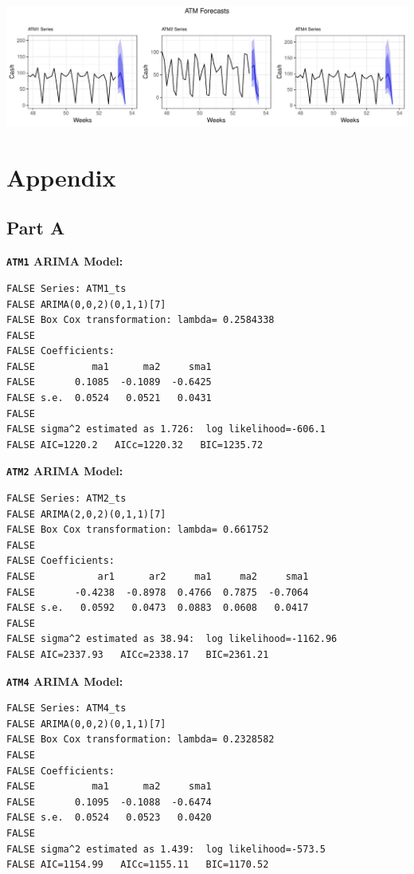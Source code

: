 \documentclass[openany]{book}
\begin{document}
\includegraphics{Part-A-JM_files/figure-latex/unnamed-chunk-7-1.pdf}

\hypertarget{Appendix}{%
\chapter*{Appendix}\label{Appendix}}

\hypertarget{Part-A}{%
\section*{Part A}\label{Part-A}}

\textbf{\texttt{ATM1} ARIMA Model:}

\begin{verbatim}
FALSE Series: ATM1_ts 
FALSE ARIMA(0,0,2)(0,1,1)[7] 
FALSE Box Cox transformation: lambda= 0.2584338 
FALSE 
FALSE Coefficients:
FALSE          ma1      ma2     sma1
FALSE       0.1085  -0.1089  -0.6425
FALSE s.e.  0.0524   0.0521   0.0431
FALSE 
FALSE sigma^2 estimated as 1.726:  log likelihood=-606.1
FALSE AIC=1220.2   AICc=1220.32   BIC=1235.72
\end{verbatim}

\textbf{\texttt{ATM2} ARIMA Model:}

\begin{verbatim}
FALSE Series: ATM2_ts 
FALSE ARIMA(2,0,2)(0,1,1)[7] 
FALSE Box Cox transformation: lambda= 0.661752 
FALSE 
FALSE Coefficients:
FALSE           ar1      ar2     ma1     ma2     sma1
FALSE       -0.4238  -0.8978  0.4766  0.7875  -0.7064
FALSE s.e.   0.0592   0.0473  0.0883  0.0608   0.0417
FALSE 
FALSE sigma^2 estimated as 38.94:  log likelihood=-1162.96
FALSE AIC=2337.93   AICc=2338.17   BIC=2361.21
\end{verbatim}

\textbf{\texttt{ATM4} ARIMA Model:}

\begin{verbatim}
FALSE Series: ATM4_ts 
FALSE ARIMA(0,0,2)(0,1,1)[7] 
FALSE Box Cox transformation: lambda= 0.2328582 
FALSE 
FALSE Coefficients:
FALSE          ma1      ma2     sma1
FALSE       0.1095  -0.1088  -0.6474
FALSE s.e.  0.0524   0.0523   0.0420
FALSE 
FALSE sigma^2 estimated as 1.439:  log likelihood=-573.5
FALSE AIC=1154.99   AICc=1155.11   BIC=1170.52
\end{verbatim}
\end{document}
